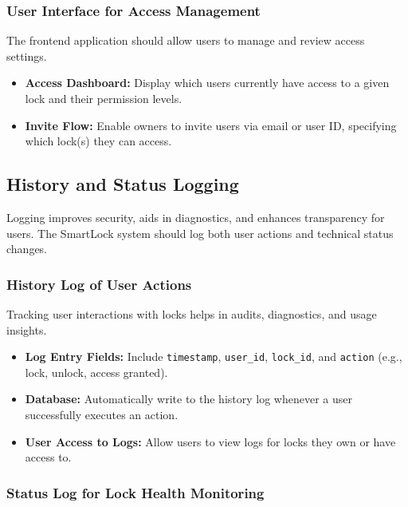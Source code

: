 \subsubsection{User Interface for Access Management}

The frontend application should allow users to manage and review access settings.

\begin{itemize}
  \item \textbf{Access Dashboard:} Display which users currently have access to a given lock and their permission levels.
  \item \textbf{Invite Flow:} Enable owners to invite users via email or user ID, specifying which lock(s) they can access.
\end{itemize}

%
%
%
%

\newpage
\subsection{History and Status Logging}

 Logging improves security, aids in diagnostics, and enhances transparency for users. The SmartLock system should log both user actions and technical status changes.

\subsubsection{History Log of User Actions}

Tracking user interactions with locks helps in audits, diagnostics, and usage insights.

\begin{itemize}
  \item \textbf{Log Entry Fields:} Include \texttt{timestamp}, \texttt{user\_id}, \texttt{lock\_id}, and \texttt{action} (e.g., lock, unlock, access granted).
  \item \textbf{Database:} Automatically write to the history log whenever a user successfully executes an action.
  \item \textbf{User Access to Logs:} Allow users to view logs for locks they own or have access to.
\end{itemize}

\subsubsection{Status Log for Lock Health Monitoring}

